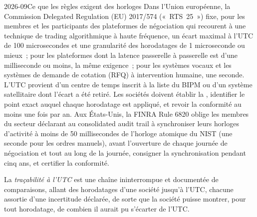 \begin{dated}{2026-09}{Ce que les règles exigent des horloges}\label{dat:nw:time-synchronisation:rules}
Dans l'Union européenne, la Commission Delegated Regulation (EU) 2017/574 («~RTS~25~») fixe, pour les membres et les participants des plateformes de négociation
qui recourent à une technique de trading algorithmique à haute fréquence, un écart maximal à l'UTC de 100 microsecondes et une granularité des horodatages de
1 microseconde ou mieux~; pour les plateformes dont la latence passerelle à passerelle est d'une milliseconde ou moins, la même exigence~; pour les systèmes vocaux et
les systèmes de demande de cotation (RFQ) à intervention humaine, une seconde. L'UTC provient d'un centre de temps inscrit à la liste du BIPM ou d'un système satellitaire
dont l'écart a été retiré. Les sociétés doivent établir la , identifier le point exact auquel chaque horodatage est appliqué, et
revoir la conformité au moins une fois par an. Aux États-Unis, la FINRA Rule 6820 oblige les membres du secteur déclarant au
consolidated audit trail à synchroniser leurs horloges d'activité à moins de 50 millisecondes de l'horloge atomique du NIST (une seconde pour les ordres manuels),
avant l'ouverture de chaque journée de négociation et tout au long de la journée, consigner la synchronisation pendant cinq ans, et certifier la conformité.
\end{dated}

\begin{definition}\label{def:nw:time-synchronisation:trace}
La \emph{traçabilité à l'UTC} est une chaîne ininterrompue et documentée de comparaisons, allant des horodatages d'une société jusqu'à l'UTC,
chacune assortie d'une incertitude déclarée, de sorte que la société puisse montrer, pour tout horodatage, de combien il aurait pu s'écarter de l'UTC.
\end{definition}

